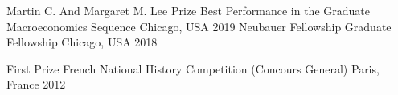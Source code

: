 

\begin{cvhonors}

	\cvhonor
	{Martin C. And Margaret M. Lee Prize} %
	{Best Performance in the Graduate Macroeconomics Sequence} %
	{Chicago, USA} %
	{2019} %
	\cvhonor
	{Neubauer Fellowship} %
	{Graduate Fellowship} %
	{Chicago, USA} %
	{2018} %

	\cvhonor
	{First Prize} %
	{French National History Competition (Concours General)} %
	{Paris, France} %
	{2012} %

\end{cvhonors}
